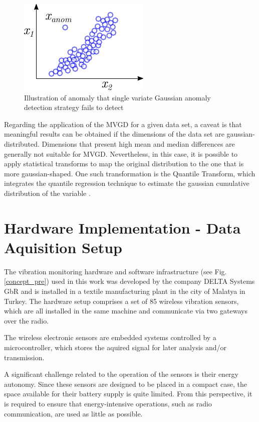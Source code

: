 \documentclass[conference]{IEEEtran}
\begin{document}
\begin{figure}[htbp]
\centerline{\includegraphics[width=0.3\columnwidth]{graphics/single_variab_innadequate.pdf}}
\caption{Illustration of anomaly that single variate Gaussian anomaly detection strategy fails to detect}
\label{fig_mvg_singlecaseinnadequade}
\end{figure}

Regarding the application of the MVGD for a given data set, a caveat is that meaningful results can be obtained if the dimensions of the data set are gaussian-distributed. Dimensions that present high mean and median differences are generally not suitable for MVGD. Nevertheless, in this case, it is possible to apply statistical transforms to map the original distribution to the one that is more gaussian-shaped. One such transformation is the Quantile Transform, which integrates the quantile regression technique to estimate the gaussian cumulative distribution of the variable \cite{koenker2001quantile}.


\section{Hardware Implementation - Data Aquisition Setup}
\label{sec_implementation}

The vibration monitoring hardware and software infrastructure (see Fig. \ref{concept_pre}) used in this work was developed by the company DELTA Systems GbR and is installed in a textile manufacturing plant in the city of Malatya in Turkey. The hardware setup comprises a set of 85 wireless vibration sensors, which are all installed in the same machine and communicate via two gateways over the radio.

The wireless electronic sensors are embedded systems controlled by a microcontroller, which stores the aquired signal for later analysis and/or transmission.

A significant challenge related to the operation of the sensors is their energy autonomy. Since these sensors are designed to be placed in a compact case, the space available for their battery supply is quite limited. From this perspective, it is required to ensure that energy-intensive operations, such as radio communication, are used as little as possible.
\end{document}
